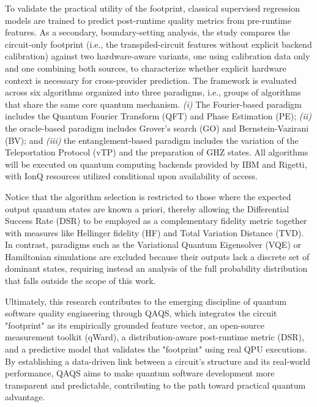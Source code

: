 \documentclass{article}
\begin{document}
To validate the practical utility of the footprint, classical supervised regression models are trained to predict post-runtime quality metrics from pre-runtime features. As a secondary, boundary-setting analysis, the study compares the circuit-only footprint (i.e., the transpiled-circuit features without explicit backend calibration) against two hardware-aware variants, one using calibration data only and one combining both sources, to characterize whether explicit hardware context is necessary for cross-provider prediction. The framework is evaluated across six algorithms organized into three paradigms, i.e., groups of algorithms that share the same core quantum mechanism. \emph{(i)} The Fourier-based paradigm includes the Quantum Fourier Transform (QFT) and Phase Estimation (PE); \emph{(ii)} the oracle-based paradigm includes Grover's search (GO) and Bernstein-Vazirani (BV); and \emph{(iii)} the entanglement-based paradigm includes the variation of the Teleportation Protocol (vTP) and the preparation of GHZ states. All algorithms will be executed on quantum computing backends provided by IBM and Rigetti, with IonQ resources utilized conditional upon availability of access.

Notice that the algorithm selection is restricted to those where the expected output quantum states are known a priori, thereby allowing the Differential Success Rate (DSR) to be employed as a complementary fidelity metric together with measures like Hellinger fidelity (HF) and Total Variation Distance (TVD). In contrast, paradigms such as the Variational Quantum Eigensolver (VQE) or Hamiltonian simulations are excluded because their outputs lack a discrete set of dominant states, requiring instead an analysis of the full probability distribution that falls outside the scope of this work.

Ultimately, this research contributes to the emerging discipline of quantum software quality engineering through QAQS, which integrates the circuit "footprint" as its empirically grounded feature vector, an open-source measurement toolkit (qWard), a distribution-aware post-runtime metric (DSR), and a predictive model that validates the "footprint" using real QPU executions. By establishing a data-driven link between a circuit's structure and its real-world performance, QAQS aims to make quantum software development more transparent and predictable, contributing to the path toward practical quantum advantage.

\newpage

\tableofcontents
\end{document}
